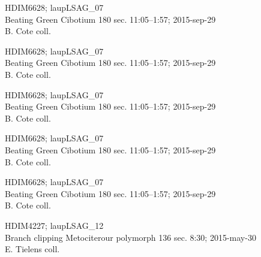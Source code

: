 \documentclass[2pt]{extarticle}
\begin{document}
\noindent
\parbox{0.16\textwidth}{\tiny \raggedright \rule[-0.3\baselineskip]{0pt}{10pt}HDIM6628; laupLSAG\_07\\ Beating Green Cibotium 180 sec. 11:05--1:57; 2015-sep-29\\ B. Cote coll.}
\parbox{0.16\textwidth}{\tiny \raggedright \rule[-0.3\baselineskip]{0pt}{10pt}HDIM6628; laupLSAG\_07\\ Beating Green Cibotium 180 sec. 11:05--1:57; 2015-sep-29\\ B. Cote coll.}
\parbox{0.16\textwidth}{\tiny \raggedright \rule[-0.3\baselineskip]{0pt}{10pt}HDIM6628; laupLSAG\_07\\ Beating Green Cibotium 180 sec. 11:05--1:57; 2015-sep-29\\ B. Cote coll.}
\parbox{0.16\textwidth}{\tiny \raggedright \rule[-0.3\baselineskip]{0pt}{10pt}HDIM6628; laupLSAG\_07\\ Beating Green Cibotium 180 sec. 11:05--1:57; 2015-sep-29\\ B. Cote coll.}
\parbox{0.16\textwidth}{\tiny \raggedright \rule[-0.3\baselineskip]{0pt}{10pt}HDIM6628; laupLSAG\_07\\ Beating Green Cibotium 180 sec. 11:05--1:57; 2015-sep-29\\ B. Cote coll.}
\parbox{0.16\textwidth}{\tiny \raggedright \rule[-0.3\baselineskip]{0pt}{10pt}HDIM4227; laupLSAG\_12\\ Branch clipping Metociterour polymorph 136 sec. 8:30; 2015-may-30\\ E. Tielens coll.} \\ 
\vspace{0.001in} 
\end{document}

